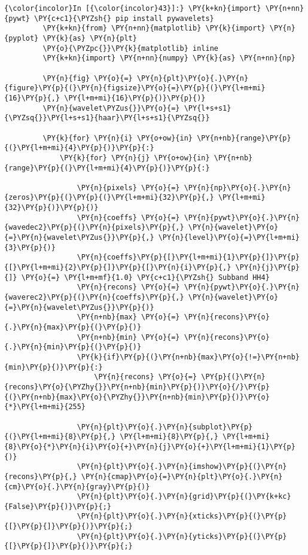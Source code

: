     \begin{Verbatim}[commandchars=\\\{\}]
{\color{incolor}In [{\color{incolor}43}]:} \PY{k+kn}{import} \PY{n+nn}{pywt} \PY{c+c1}{\PYZsh{} pip install pywavelets}
         \PY{k+kn}{from} \PY{n+nn}{matplotlib} \PY{k}{import} \PY{n}{pyplot} \PY{k}{as} \PY{n}{plt}
         \PY{o}{\PYZpc{}}\PY{k}{matplotlib} inline
         \PY{k+kn}{import} \PY{n+nn}{numpy} \PY{k}{as} \PY{n+nn}{np}
         
         \PY{n}{fig} \PY{o}{=} \PY{n}{plt}\PY{o}{.}\PY{n}{figure}\PY{p}{(}\PY{n}{figsize}\PY{o}{=}\PY{p}{(}\PY{l+m+mi}{16}\PY{p}{,} \PY{l+m+mi}{16}\PY{p}{)}\PY{p}{)}
         \PY{n}{wavelet\PYZus{}}\PY{o}{=} \PY{l+s+s1}{\PYZsq{}}\PY{l+s+s1}{haar}\PY{l+s+s1}{\PYZsq{}}
         
         \PY{k}{for} \PY{n}{i} \PY{o+ow}{in} \PY{n+nb}{range}\PY{p}{(}\PY{l+m+mi}{4}\PY{p}{)}\PY{p}{:}
             \PY{k}{for} \PY{n}{j} \PY{o+ow}{in} \PY{n+nb}{range}\PY{p}{(}\PY{l+m+mi}{4}\PY{p}{)}\PY{p}{:}
         
                 \PY{n}{pixels} \PY{o}{=} \PY{n}{np}\PY{o}{.}\PY{n}{zeros}\PY{p}{(}\PY{p}{(}\PY{l+m+mi}{32}\PY{p}{,} \PY{l+m+mi}{32}\PY{p}{)}\PY{p}{)}
                 \PY{n}{coeffs} \PY{o}{=} \PY{n}{pywt}\PY{o}{.}\PY{n}{wavedec2}\PY{p}{(}\PY{n}{pixels}\PY{p}{,} \PY{n}{wavelet}\PY{o}{=}\PY{n}{wavelet\PYZus{}}\PY{p}{,} \PY{n}{level}\PY{o}{=}\PY{l+m+mi}{3}\PY{p}{)}
                 \PY{n}{coeffs}\PY{p}{[}\PY{l+m+mi}{1}\PY{p}{]}\PY{p}{[}\PY{l+m+mi}{2}\PY{p}{]}\PY{p}{[}\PY{n}{i}\PY{p}{,} \PY{n}{j}\PY{p}{]} \PY{o}{=} \PY{l+m+mf}{1.0} \PY{c+c1}{\PYZsh{} Subband HH4}
                 \PY{n}{recons} \PY{o}{=} \PY{n}{pywt}\PY{o}{.}\PY{n}{waverec2}\PY{p}{(}\PY{n}{coeffs}\PY{p}{,} \PY{n}{wavelet}\PY{o}{=}\PY{n}{wavelet\PYZus{}}\PY{p}{)}
                 \PY{n+nb}{max} \PY{o}{=} \PY{n}{recons}\PY{o}{.}\PY{n}{max}\PY{p}{(}\PY{p}{)}
                 \PY{n+nb}{min} \PY{o}{=} \PY{n}{recons}\PY{o}{.}\PY{n}{min}\PY{p}{(}\PY{p}{)}
                 \PY{k}{if}\PY{p}{(}\PY{n+nb}{max}\PY{o}{!=}\PY{n+nb}{min}\PY{p}{)}\PY{p}{:}
                     \PY{n}{recons} \PY{o}{=} \PY{p}{(}\PY{n}{recons}\PY{o}{\PYZhy{}}\PY{n+nb}{min}\PY{p}{)}\PY{o}{/}\PY{p}{(}\PY{n+nb}{max}\PY{o}{\PYZhy{}}\PY{n+nb}{min}\PY{p}{)}\PY{o}{*}\PY{l+m+mi}{255}
                     
                 \PY{n}{plt}\PY{o}{.}\PY{n}{subplot}\PY{p}{(}\PY{l+m+mi}{8}\PY{p}{,} \PY{l+m+mi}{8}\PY{p}{,} \PY{l+m+mi}{8}\PY{o}{*}\PY{n}{i}\PY{o}{+}\PY{n}{j}\PY{o}{+}\PY{l+m+mi}{1}\PY{p}{)}
                 \PY{n}{plt}\PY{o}{.}\PY{n}{imshow}\PY{p}{(}\PY{n}{recons}\PY{p}{,} \PY{n}{cmap}\PY{o}{=}\PY{n}{plt}\PY{o}{.}\PY{n}{cm}\PY{o}{.}\PY{n}{gray}\PY{p}{)}
                 \PY{n}{plt}\PY{o}{.}\PY{n}{grid}\PY{p}{(}\PY{k+kc}{False}\PY{p}{)}\PY{p}{;}
                 \PY{n}{plt}\PY{o}{.}\PY{n}{xticks}\PY{p}{(}\PY{p}{[}\PY{p}{]}\PY{p}{)}\PY{p}{;}
                 \PY{n}{plt}\PY{o}{.}\PY{n}{yticks}\PY{p}{(}\PY{p}{[}\PY{p}{]}\PY{p}{)}\PY{p}{;}
\end{Verbatim}


